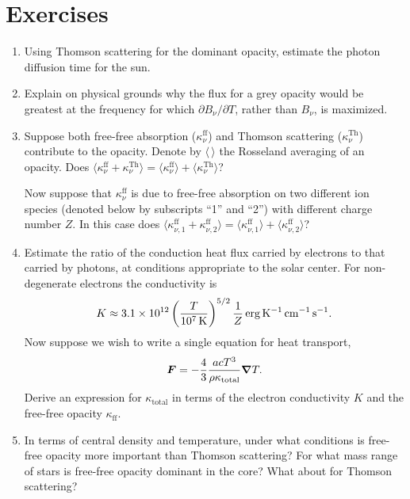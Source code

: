 \section{Exercises}
\begin{enumerate}

\item Using Thomson scattering for the dominant opacity, estimate the photon diffusion time for the sun. 

\item Explain on physical grounds why the flux for a grey opacity would be greatest at the frequency for which $\partial B_{\nu}/\partial T$, rather than $B_{\nu}$, is maximized.

\item Suppose both free-free absorption ($\kappa^{\mathrm{ff}}_{\nu}$) and Thomson scattering ($\kappa^{\mathrm{Th}}_{\nu}$) contribute to the opacity. Denote by $\langle\,\rangle$ the Rosseland averaging of an opacity.  Does $\langle \kappa^{\mathrm{ff}}_{\nu} + \kappa^{\mathrm{Th}}_{\nu}\rangle = \langle\kappa^{\mathrm{ff}}_{\nu}\rangle+\langle\kappa^{\mathrm{Th}}_{\nu}\rangle$? 

Now suppose that $\kappa^{\mathrm{ff}}_{\nu}$ is due to free-free absorption on two different ion species (denoted below by subscripts ``1'' and ``2'') with different charge number $Z$.  In this case does $\langle \kappa^{\mathrm{ff}}_{\nu,1} + \kappa^{\mathrm{ff}}_{\nu,2}\rangle = \langle\kappa^{\mathrm{ff}}_{\nu,1}\rangle+\langle\kappa^{\mathrm{ff}}_{\nu,2}\rangle$?

\item Estimate the ratio of the conduction heat flux carried by electrons to that carried by photons, at conditions appropriate to the solar center.  For non-degenerate electrons the conductivity is \citep{spitzer62:_physic}
\[
K \approx 3.1\times 10^{12}  \left(\frac{T}{10^{7}\,\mathrm{K}}\right)^{5/2}\frac{1}{Z}\,\mathrm{erg}\,\mathrm{K}^{-1}\,\mathrm{c}\mathrm{m}^{-1}\,\mathrm{s}^{-1}.
\]
Now suppose we wish to write a single equation for heat transport,
\[
\boldsymbol{F} =  -\frac{4}{3} \frac{acT^{3}}{\rho\kappa_{\mathrm{total}}}\boldsymbol{\nabla} T.
 \]
Derive an expression for $\kappa_{\mathrm{total}}$ in terms of the electron conductivity $K$ and the free-free opacity $\kappa_{\mathrm{ff}}$.  

\item In terms of central density and temperature, under what conditions is free-free opacity more important than Thomson scattering?  For what mass range of stars is free-free opacity dominant in the core? What about for Thomson scattering?


\end{enumerate}
